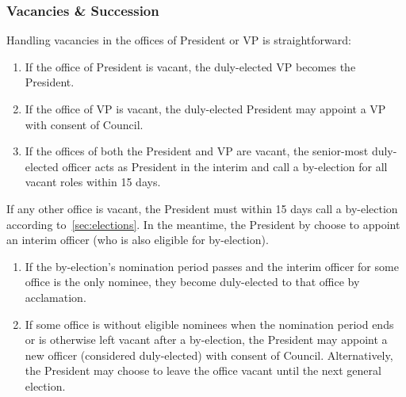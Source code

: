 \subsubsection{Vacancies \& Succession}\label{sec:vacancy}
Handling vacancies in the offices of President or VP is straightforward:
\begin{enumerate}
      \item If the office of President is vacant, the duly-elected VP becomes the
            President.
      \item If the office of VP is vacant, the duly-elected President may appoint a VP with
            consent of Council.
      \item If the offices of both the President and VP are vacant, the senior-most
            duly-elected officer acts as President in the interim and call a by-election
            for all vacant roles within 15 days.
\end{enumerate}
If any other office is vacant, the President must within 15 days call a by-election according to~\ref{sec:elections}. In the meantime, the President by choose to appoint an interim officer (who is also eligible for by-election).

\begin{enumerate}
      \item If the by-election's nomination period passes and the interim officer for some
            office is the only nominee, they become duly-elected to that office by
            acclamation.
      \item If some office is without eligible nominees when the nomination period ends or
            is otherwise left vacant after a by-election, the President may appoint a new
            officer (considered duly-elected) with consent of Council. Alternatively, the
            President may choose to leave the office vacant until the next general
            election.
\end{enumerate}